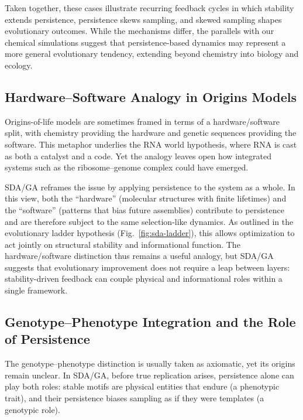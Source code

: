 \documentclass[life,article,submit,pdftex,moreauthors]{Definitions/mdpi}
\begin{document}
Taken together, these cases illustrate recurring feedback cycles in which stability extends persistence, persistence skews sampling, and skewed sampling shapes evolutionary outcomes.  
While the mechanisms differ, the parallels with our chemical simulations suggest that persistence-based dynamics may represent a more general evolutionary tendency, extending beyond chemistry into biology and ecology.


\subsection{Hardware–Software Analogy in Origins Models}

Origins-of-life models are sometimes framed in terms of a hardware/software split, 
with chemistry providing the hardware \cite{fontana1991algorithmic, cronin2024chemputation} and genetic sequences providing the software. This metaphor underlies the RNA world hypothesis, where RNA is cast as both a catalyst and a code. 
Yet the analogy leaves open how integrated systems such as the ribosome–genome complex could have emerged.  

SDA/GA reframes the issue by applying persistence to the system as a whole.  
In this view, both the “hardware” (molecular structures with finite lifetimes) 
and the “software” (patterns that bias future assemblies) contribute to persistence 
and are therefore subject to the same selection-like dynamics.  
As outlined in the evolutionary ladder hypothesis (Fig.~\ref{fig:sda-ladder}), 
this allows optimization to act jointly on structural stability and informational function.  
The hardware/software distinction thus remains a useful analogy, but SDA/GA suggests 
that evolutionary improvement does not require a leap between layers: stability-driven 
feedback can couple physical and informational roles within a single framework.



\subsection{Genotype–Phenotype Integration and the Role of Persistence}

The genotype–phenotype distinction is usually taken as axiomatic, yet its origins remain unclear.  
In SDA/GA, before true replication arises, persistence alone can play both roles: 
stable motifs are physical entities that endure (a phenotypic trait), and their persistence biases sampling 
as if they were templates (a genotypic role).  
\end{document}
